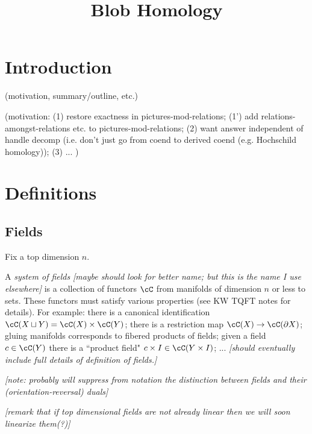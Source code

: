 \documentclass[11pt,leqno]{article}
\title{Blob Homology}
\def\du{\sqcup}
\def\bd{\partial}
\def\nn#1{{{\it \small [#1]}}}
\begin{document}
\makeatletter
{}
\gdef\theequation{\thesection.\arabic{equation}}
\makeatother
\newtheorem{thm}[equation]{Theorem}
\newtheorem{prop}[equation]{Proposition}
\newtheorem{lemma}[equation]{Lemma}
\newtheorem{cor}[equation]{Corollary}
\newtheorem{defn}[equation]{Definition}



\maketitle

\section{Introduction}

(motivation, summary/outline, etc.)

(motivation: 
(1) restore exactness in pictures-mod-relations;
(1') add relations-amongst-relations etc. to pictures-mod-relations;
(2) want answer independent of handle decomp (i.e. don't 
just go from coend to derived coend (e.g. Hochschild homology));
(3) ...
)

\section{Definitions}

\subsection{Fields}

Fix a top dimension $n$.

A {\it system of fields} 
\nn{maybe should look for better name; but this is the name I use elsewhere}
is a collection of functors $\cC$ from manifolds of dimension $n$ or less
to sets.
These functors must satisfy various properties (see KW TQFT notes for details).
For example: 
there is a canonical identification $\cC(X \du Y) = \cC(X) \times \cC(Y)$;
there is a restriction map $\cC(X) \to \cC(\bd X)$;
gluing manifolds corresponds to fibered products of fields;
given a field $c \in \cC(Y)$ there is a ``product field" 
$c\times I \in \cC(Y\times I)$; ...
\nn{should eventually include full details of definition of fields.}

\nn{note: probably will suppress from notation the distinction 
between fields and their (orientation-reversal) duals}

\nn{remark that if top dimensional fields are not already linear
then we will soon linearize them(?)}
\end{document}
